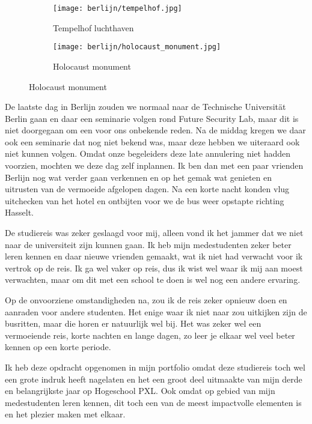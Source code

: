 \begin{figure}[!h]
  \centering
  \begin{subfigure}[h]{0.48\textwidth}
    \texttt{[image: berlijn/tempelhof.jpg]}
    \caption{Tempelhof luchthaven}
  \end{subfigure}
  \begin{subfigure}[h]{0.48\textwidth}
    \texttt{[image: berlijn/holocaust\_monument.jpg]}
    \caption{Holocaust monument}
  \end{subfigure}
\end{figure}

De laatste dag in Berlijn zouden we normaal naar de Technische Universit\"at Berlin gaan en daar een seminarie volgen rond Future Security Lab, maar dit is niet doorgegaan om een voor ons onbekende reden. Na de middag kregen we daar ook een seminarie dat nog niet bekend was, maar deze hebben we uiteraard ook niet kunnen volgen. Omdat onze begeleiders deze late annulering niet hadden voorzien, mochten we deze dag zelf inplannen. Ik ben dan met een paar vrienden Berlijn nog wat verder gaan verkennen en op het gemak wat genieten en uitrusten van de vermoeide afgelopen dagen. Na een korte nacht konden vlug uitchecken van het hotel en ontbijten voor we de bus weer opstapte richting Hasselt.

De studiereis was zeker geslaagd voor mij, alleen vond ik het jammer dat we niet naar de universiteit zijn kunnen gaan. Ik heb mijn medestudenten zeker beter leren kennen en daar nieuwe vrienden gemaakt, wat ik niet had verwacht voor ik vertrok op de reis. Ik ga wel vaker op reis, dus ik wist wel waar ik mij aan moest verwachten, maar om dit met een school te doen is wel nog een andere ervaring.

Op de onvoorziene omstandigheden na, zou ik de reis zeker opnieuw doen en aanraden voor andere studenten. Het enige waar ik niet naar zou uitkijken zijn de busritten, maar die horen er natuurlijk wel bij. Het was zeker wel een vermoeiende reis, korte nachten en lange dagen, zo leer je elkaar wel veel beter kennen op een korte periode.

Ik heb deze opdracht opgenomen in mijn portfolio omdat deze studiereis toch wel een grote indruk heeft nagelaten en het een groot deel uitmaakte van mijn derde en belangrijkste jaar op Hogeschool PXL. Ook omdat op gebied van mijn medestudenten leren kennen, dit toch een van de meest impactvolle elementen is en het plezier maken met elkaar.

